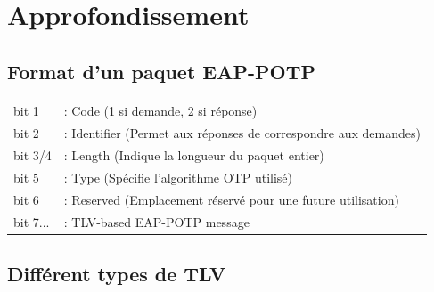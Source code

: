 \documentclass{../res/univ-projet}
\begin{document}
\section{Approfondissement}

\subsection{Format d'un paquet EAP-POTP}

\begin{tabular}{  l  l  }
	bit 1 &: Code (1 si demande, 2 si réponse)\\
	bit 2 &: Identifier (Permet aux réponses de correspondre aux demandes)\\
	bit 3/4 &: Length (Indique la longueur du paquet entier)\\
	bit 5 &: Type (Spécifie l'algorithme OTP utilisé)\\
	bit 6 &: Reserved (Emplacement réservé pour une future utilisation)\\
	bit 7... &: TLV-based EAP-POTP message \\
\end{tabular}

\subsection{Différent types de TLV}
\end{document}
